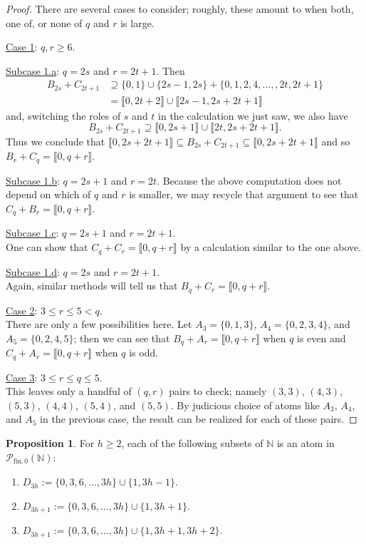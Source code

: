 \documentclass{report}
\newcommand{\NN}{\mathbb{N}}
\renewcommand{\P}{\mathcal{P}}
\newcommand{\llb}{\llbracket}
\newcommand{\rrb}{\rrbracket}
\newcommand{\fin}{\textrm{fin}}
\renewcommand{\:}{\text{:}}
\newcommand{\PN}{{\P_{\fin,0}(\NN)}}
\theoremstyle{definition}
\newtheorem{prop}[defn]{Proposition}
\begin{document}
\begin{proof}
	There are several cases to consider; roughly, these amount to when both, one of, or none of $q$ and $r$ is large.
	
	\underline{Case 1}: $q,r \ge 6$. 
	
	\underline{Subcase 1.a}: $q = 2s$ and $r = 2t+1$.
	Then 
	\begin{align*}
	B_{2s} + C_{2t+1} 
	&\supseteq \{0,1\}\cup\{2s-1,2s\} + \{0,1,2,4,\dots, ,2t,2t+1\} \\
	&= \llb 0, 2t+2 \rrb \cup \llb 2s-1,2s+2t+1 \rrb
	\end{align*}
	and, switching the roles of $s$ and $t$ in the calculation we just saw, we also have 
	\[B_{2s}+C_{2t+1} \supseteq \llb 0,2s+1 \rrb \cup \llb 2t,2s+2t+1 \rrb.\]
	Thus we conclude that $\llb 0,2s+2t+1 \rrb \subseteq B_{2s}+C_{2t+1} \subseteq \llb 0,2s+2t+1 \rrb$ and so $B_r + C_q = \llb 0,q+r \rrb$.
	
	\underline{Subcase 1.b}: $q = 2s+1$ and $r = 2t$.
	Because the above computation does not depend on which of $q$ and $r$ is smaller, we may recycle that argument to see that $C_q + B_r = \llb 0,q+r \rrb$.
	
	\underline{Subcase 1.c}: $q = 2s+1$ and $r = 2t+1$.\\
	One can show that $C_q + C_r = \llb 0,q+r \rrb$ by a calculation similar to the one above.
	
	\underline{Subcase 1.d}: $q = 2s$ and $r = 2t+1$. \\
	Again, similar methods will tell us that $B_q + C_r = \llb 0,q+r \rrb$.
	
	\underline{Case 2}: $3 \le r \le 5 < q$.\\
	There are only a few possibilities here.
	Let $A_3 = \{0,1,3\}$, $A_4 = \{0,2,3,4\}$, and $A_5 = \{0,2,4,5\}$; then we can see that $B_q +A_r = \llb 0,q+r \rrb$ when $q$ is even and $C_q + A_r = \llb 0,q+r \rrb$ when $q$ is odd.
	
	\underline{Case 3}: $3\le r\le q \le 5$.\\
	This leaves only a handful of $(q,r)$ pairs to check; namely $(3,3)$, $(4,3)$, $(5,3)$, $(4,4)$, $(5,4)$, and $(5,5)$.
	By judicious choice of atoms like $A_3$, $A_4$, and $A_5$ in the previous case, the result can be realized for each of these pairs.
\end{proof}

\begin{prop} \label{prop:3-congruence atoms}
	For $h\ge 2$, each of the following subsets of $\NN$ is an atom in $\PN$:
	\begin{enumerate}[label={\rm (\roman{*})}]
		\item $D_{3h} := \{0,3,6,\dots, 3h\} \cup \{ 1, 3h-1 \}$.
		\item $D_{3h+1} := \{0,3,6,\dots, 3h\} \cup \{ 1, 3h+1 \}$.
		\item $D_{3h+1} := \{0,3,6,\dots, 3h\} \cup \{ 1, 3h+1, 3h+2 \}$.
	\end{enumerate}
\end{prop}
\end{document}

